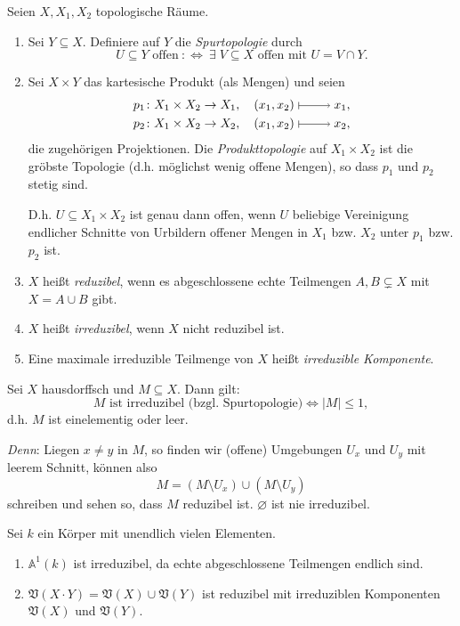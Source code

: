 \documentclass[a4paper,12pt]{scrbook}
\def\A{\mathbb{A}}
\def\V{\mathfrak{V}}
\newcommand{\leer}{\ensuremath{\varnothing}}
\newcommand{\card}[1]{|#1|}
\renewcommand{\mapsto}{\raisebox{-1pt}{\tikz{\draw[thin,shorten >=3pt, |->] (0,0) node{\hspace*{0pt}} -- node{} (1,0);}}\penalty1000\relax}
\begin{document}
\begin{de}\label{1.2.6} Seien $X,X_{1},X_{2}$ topologische Räume.
\begin{enumerate}
\item Sei $Y\subseteq X$. Definiere auf $Y$ die \emph{Spurtopologie} durch
\[U\subseteq Y\text{ offen}\: :\Longleftrightarrow\:\exists\;V\subseteq X\text{ offen mit }U=V\cap Y.\]
\item Sei $X\times Y$ das kartesische Produkt (als Mengen) und seien
\begin{align*}p_{1}\colon X_{1}\times X_{2}\rightarrow X_{1},\quad(x_{1},x_{2})\mapsto x_{1},\\p_{2}\colon X_{1}\times X_{2}\rightarrow X_{2},\quad(x_{1},x_{2})\mapsto x_{2},\end{align*}
die zugehörigen Projektionen. Die \emph{Produkttopologie} auf $X_{1}\times X_{2}$ ist die gröbste Topologie (d.h. möglichst wenig offene Mengen), so dass $p_{1}$ und $p_{2}$ stetig sind.

D.h. $U\subseteq X_{1}\times X_{2}$ ist genau dann offen, wenn $U$ beliebige Vereinigung endlicher Schnitte von Urbildern offener Mengen in $X_{1}$ bzw. $X_{2}$ unter $p_{1}$ bzw. $p_{2}$ ist.

\item $X$ heißt \emph{reduzibel}, wenn es abgeschlossene echte Teilmengen $A,B\subsetneq X$ mit $X=A\cup B$ gibt.

\item $X$ heißt \emph{irreduzibel}, wenn $X$ nicht reduzibel ist.

\item Eine maximale irreduzible Teilmenge von $X$ heißt \emph{irreduzible Komponente}.
\end{enumerate}\end{de}

\begin{bsp}\label{1.2.7}
Sei $X$ hausdorffsch und $M\subseteq X$. Dann gilt:
\[M\text{ ist irreduzibel (bzgl. Spurtopologie)}\iff \card{M}\leq 1,\]
d.h. $M$ ist einelementig oder leer.

\emph{Denn}: Liegen $x\neq y$ in $M$, so finden wir (offene) Umgebungen $U_{x}$ und $U_{y}$ mit leerem Schnitt, können also
\[M=(M\setminus U_{x})\cup(M\setminus U_{y})\]
schreiben und sehen so, dass $M$ reduzibel ist. $\leer$ ist nie irreduzibel.
\end{bsp}

\begin{bsp}\label{1.2.8} Sei $k$ ein Körper mit unendlich vielen Elementen.
\begin{enumerate}
\item{} $\A^{1}(k)$ ist irreduzibel, da echte abgeschlossene Teilmengen endlich sind.
\item\label{1.2.8b} $\V(X\cdot Y) = \V(X)\cup\V(Y)$ ist reduzibel mit irreduziblen Komponenten $\V(X)$ und $\V(Y)$.
\end{enumerate}\end{bsp}
\end{document}
